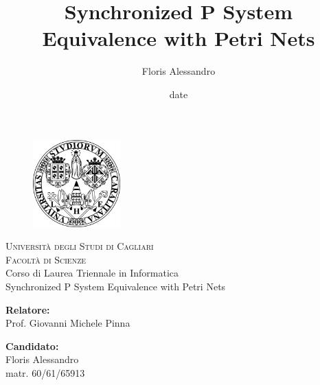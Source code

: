 \title{Synchronized P System Equivalence with Petri Nets}
\author{Floris Alessandro}
\date{date}

\begin{titlepage}
\begin{figure}[t]
    \centering\includegraphics[width=0.3\textwidth]{images/logo.png}
\end{figure}
\begin{center}
    \textsc{ \LARGE{Università degli Studi di Cagliari \\}}
	\textsc{ \LARGE{Facoltà di Scienze\\ }}
	\textnormal{ \LARGE{Corso di Laurea Triennale in Informatica\\}}
	\vspace{30mm}
	\fontsize{10mm}{7mm}\selectfont 
    \textup{Synchronized P System Equivalence with Petri Nets}\\
\end{center}

\vspace{25mm}

\begin{minipage}[t]{0.47\textwidth}
	\textnormal{\large{\bf Relatore:\\}}
	{\large Prof. Giovanni Michele Pinna}
\end{minipage}\hfill\begin{minipage}[t]{0.47\textwidth}\raggedleft
	\textnormal{\large{\bf Candidato:\\}}
	{\large Floris Alessandro\\ matr. 60/61/65913}
\end{minipage}

\vspace{20mm}


\end{titlepage}
